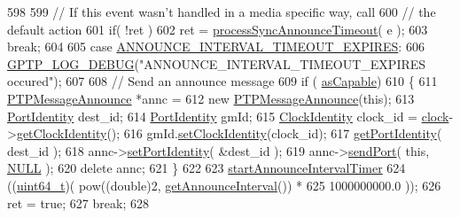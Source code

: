 \begin{DoxyCode}
598 
599         \textcolor{comment}{// If this event wasn't handled in a media specific way, call}
600         \textcolor{comment}{// the default action}
601         \textcolor{keywordflow}{if}( !ret )
602             ret = \hyperlink{class_common_port_aebebd8986a920f60f1ecc1f8e5a027d0}{processSyncAnnounceTimeout}( e );
603         \textcolor{keywordflow}{break};
604 
605     \textcolor{keywordflow}{case} \hyperlink{ieee1588_8hpp_a5667b805d857c6d28f83f6038a0272d3acd9bfe0c66373bb54c37784519f53d3a}{ANNOUNCE\_INTERVAL\_TIMEOUT\_EXPIRES}:
606         \hyperlink{gptp__log_8hpp_ae4c6efe7c9cf6d7d3bbd28a0fd087d61}{GPTP\_LOG\_DEBUG}(\textcolor{stringliteral}{"ANNOUNCE\_INTERVAL\_TIMEOUT\_EXPIRES occured"});
607 
608         \textcolor{comment}{// Send an announce message}
609         \textcolor{keywordflow}{if} ( \hyperlink{class_common_port_a15a09cf240fb37b905e4d4e1e9f5b9a1}{asCapable})
610         \{
611             \hyperlink{class_p_t_p_message_announce}{PTPMessageAnnounce} *annc =
612                 \textcolor{keyword}{new} \hyperlink{class_p_t_p_message_announce}{PTPMessageAnnounce}(\textcolor{keyword}{this});
613             \hyperlink{class_port_identity}{PortIdentity} dest\_id;
614             \hyperlink{class_port_identity}{PortIdentity} gmId;
615             \hyperlink{class_clock_identity}{ClockIdentity} clock\_id = \hyperlink{class_common_port_aa2bc8731fa5aeb5b033feebc2b67258c}{clock}->\hyperlink{class_i_e_e_e1588_clock_a56fd598a1dfd3bfe0658272544921162}{getClockIdentity}();
616             gmId.\hyperlink{class_port_identity_abb9510d7ee3a171a6d55ab2cec30d3a6}{setClockIdentity}(clock\_id);
617             \hyperlink{class_common_port_a563117781330d95f1c6aa43837b7e4ed}{getPortIdentity}( dest\_id );
618             annc->\hyperlink{class_p_t_p_message_common_a94378ebb164e2095d3a17b393a63f2dc}{setPortIdentity}( &dest\_id );
619             annc->\hyperlink{class_p_t_p_message_announce_ab6f43fa7d50a13391867209c8a0fca16}{sendPort}( \textcolor{keyword}{this}, \hyperlink{openavb__types__base__pub_8h_a070d2ce7b6bb7e5c05602aa8c308d0c4}{NULL} );
620             \textcolor{keyword}{delete} annc;
621         \}
622 
623         \hyperlink{class_common_port_a3938df4f200087f96727e90805c543c9}{startAnnounceIntervalTimer}
624             ((\hyperlink{parse_8c_aec6fcb673ff035718c238c8c9d544c47}{uint64\_t})( pow((\textcolor{keywordtype}{double})2, \hyperlink{class_common_port_a7aa1a5fddf7129f600c97c018087b7b8}{getAnnounceInterval}()) *
625                      1000000000.0 ));
626         ret = \textcolor{keyword}{true};
627         \textcolor{keywordflow}{break};
628 

\end{DoxyCode}
